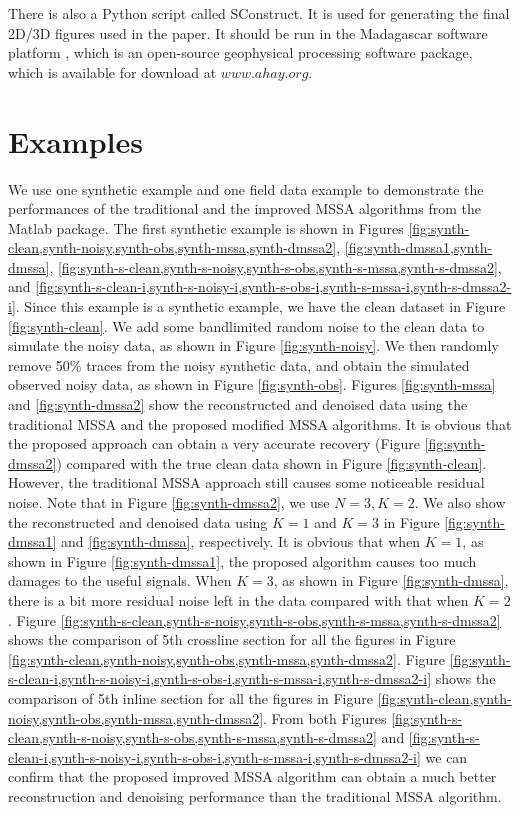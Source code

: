 There is also a Python script called SConstruct. It is used for generating the final 2D/3D figures used in the paper. It should be run in the Madagascar software platform \cite[]{mada2013}, which is an open-source geophysical processing software package, which is available for download at $www.ahay.org$. 

\section{Examples}
We use one synthetic example and one field data example to demonstrate the performances of the traditional and the improved MSSA algorithms from the Matlab package. 
The first synthetic example is shown in Figures \ref{fig:synth-clean,synth-noisy,synth-obs,synth-mssa,synth-dmssa2}, \ref{fig:synth-dmssa1,synth-dmssa}, \ref{fig:synth-s-clean,synth-s-noisy,synth-s-obs,synth-s-mssa,synth-s-dmssa2}, and \ref{fig:synth-s-clean-i,synth-s-noisy-i,synth-s-obs-i,synth-s-mssa-i,synth-s-dmssa2-i}. Since this example is a synthetic example, we have the clean dataset in Figure \ref{fig:synth-clean}. We add some bandlimited random noise to the clean data to simulate the noisy data, as shown in Figure \ref{fig:synth-noisy}. We then randomly remove 50\% traces from the noisy synthetic data, and obtain the simulated observed noisy data, as shown in Figure \ref{fig:synth-obs}. Figures \ref{fig:synth-mssa} and \ref{fig:synth-dmssa2} show the reconstructed and denoised data using the traditional MSSA and the proposed modified MSSA algorithms. It is obvious that the proposed approach can obtain a very accurate recovery (Figure \ref{fig:synth-dmssa2}) compared with the true clean data shown in Figure \ref{fig:synth-clean}. However, the traditional MSSA approach still causes some noticeable residual noise. Note that in Figure \ref{fig:synth-dmssa2}, we use $N=3,K=2$. We also show the reconstructed and denoised data using $K=1$ and $K=3$ in Figure \ref{fig:synth-dmssa1} and \ref{fig:synth-dmssa}, respectively. It is obvious that when $K=1$, as shown in Figure \ref{fig:synth-dmssa1}, the proposed algorithm causes too much damages to the useful signals. When $K=3$, as shown in Figure \ref{fig:synth-dmssa}, there is a bit more residual noise left in the data compared with that when $K=2$. Figure \ref{fig:synth-s-clean,synth-s-noisy,synth-s-obs,synth-s-mssa,synth-s-dmssa2} shows the comparison of 5th crossline section for all the figures in Figure \ref{fig:synth-clean,synth-noisy,synth-obs,synth-mssa,synth-dmssa2}.  Figure \ref{fig:synth-s-clean-i,synth-s-noisy-i,synth-s-obs-i,synth-s-mssa-i,synth-s-dmssa2-i} shows the comparison of 5th inline section for all the figures in Figure \ref{fig:synth-clean,synth-noisy,synth-obs,synth-mssa,synth-dmssa2}. From both Figures \ref{fig:synth-s-clean,synth-s-noisy,synth-s-obs,synth-s-mssa,synth-s-dmssa2} and \ref{fig:synth-s-clean-i,synth-s-noisy-i,synth-s-obs-i,synth-s-mssa-i,synth-s-dmssa2-i} we can confirm that the proposed improved MSSA algorithm can obtain a much better reconstruction and denoising performance than the traditional MSSA algorithm.

